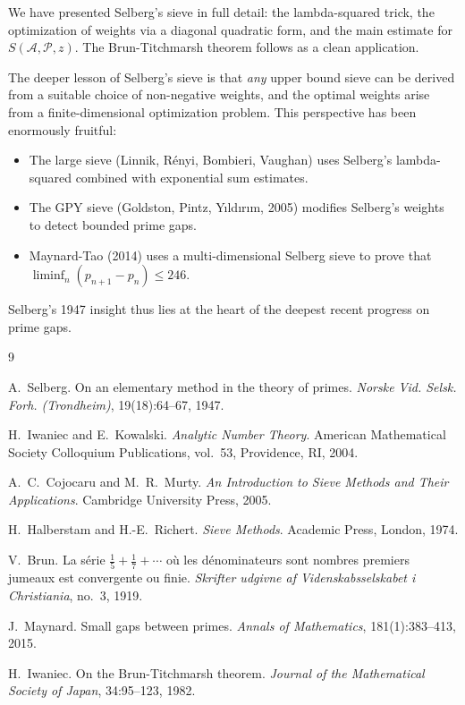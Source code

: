 \documentclass[12pt,a4paper]{amsart}
\theoremstyle{definition}
\begin{document}
We have presented Selberg's sieve in full detail: the lambda-squared trick,
the optimization of weights via a diagonal quadratic form, and the main
estimate for $S(\mathcal{A},\mathcal{P},z)$.  The Brun-Titchmarsh theorem
follows as a clean application.

The deeper lesson of Selberg's sieve is that \emph{any} upper bound sieve
can be derived from a suitable choice of non-negative weights, and the
optimal weights arise from a finite-dimensional optimization problem.  This
perspective has been enormously fruitful:
\begin{itemize}
  \item The large sieve (Linnik, Rényi, Bombieri, Vaughan) uses Selberg's
    lambda-squared combined with exponential sum estimates.
  \item The GPY sieve (Goldston, Pintz, Y{\i}ld{\i}r{\i}m, 2005) modifies
    Selberg's weights to detect bounded prime gaps.
  \item Maynard-Tao (2014) uses a multi-dimensional Selberg sieve to prove
    that $\liminf_n (p_{n+1} - p_n) \leq 246$.
\end{itemize}

Selberg's 1947 insight thus lies at the heart of the deepest recent progress
on prime gaps.

\begin{thebibliography}{9}

A.~Selberg.
\newblock On an elementary method in the theory of primes.
\newblock \emph{Norske Vid. Selsk. Forh. (Trondheim)}, 19(18):64--67, 1947.

H.~Iwaniec and E.~Kowalski.
\newblock \emph{Analytic Number Theory}.
\newblock American Mathematical Society Colloquium Publications, vol.~53,
  Providence, RI, 2004.

A.~C.~Cojocaru and M.~R.~Murty.
\newblock \emph{An Introduction to Sieve Methods and Their Applications}.
\newblock Cambridge University Press, 2005.

H.~Halberstam and H.-E.~Richert.
\newblock \emph{Sieve Methods}.
\newblock Academic Press, London, 1974.

V.~Brun.
\newblock La s{\'e}rie $\frac{1}{5}+\frac{1}{7}+\cdots$ o\`u les d{\'e}nominateurs
  sont nombres premiers jumeaux est convergente ou finie.
\newblock \emph{Skrifter udgivne af Videnskabsselskabet i Christiania}, no.~3, 1919.

J.~Maynard.
\newblock Small gaps between primes.
\newblock \emph{Annals of Mathematics}, 181(1):383--413, 2015.

H.~Iwaniec.
\newblock On the Brun-Titchmarsh theorem.
\newblock \emph{Journal of the Mathematical Society of Japan}, 34:95--123, 1982.

\end{thebibliography}
\end{document}
